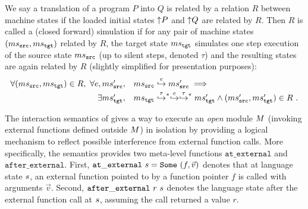 
We say a translation of a program $P$ into $Q$ is related by a
relation $R$ between machine states if the loaded initial states
${\uparrow}{P}$ and ${\uparrow}{Q}$ are related by $R$.
Then $R$ is called a (closed forward) simulation if for any
pair of machine states $(ms{}_{\texttt{src}{}},ms{}_{\texttt{tgt}{}})$ related by $R$, the target state $ms{}_{\texttt{tgt}{}}$ simulates one step
execution of the source state $ms{}_{\texttt{src}{}}$ (up to silent steps, denoted $\tau$) and the resulting
states are again related by $R$ (slightly simplified for presentation purposes):
\[
\begin{array}{r@{\ \ }l}
  \forall (\mssrc, \mstgt) \in R,~ \forall e, \mssrc',~&
  \mssrc \estep{e} \mssrc' \implies {}\\[1mm]
  \exists \mstgt',~&
  \mstgt \estep{\tau}^{\raisebox{-1mm}{\scriptsize$\ast$}} \estep{e}\estep{\tau}^{\raisebox{-1mm}{\scriptsize$\ast$}} \mstgt' \land (\mssrc', \mstgt') \in R~.
\end{array}
\]


The interaction semantics of \ccc{} gives a way to execute an
\emph{open} module $M$ (\ie invoking external functions defined
outside $M$) in isolation by providing a logical mechanism to
reflect possible interference from external function calls. More
specifically, the semantics provides two meta-level functions
$\mathtt{at\_external}$ and $\mathtt{after\_external}$. First,
$\mathtt{at\_external}~s = \mathtt{Some}~(f,\vec{v})$ denotes that
at language state $s$, an external function pointed to by a
function pointer $f$ is called with arguments $\vec{v}$. Second,
$\mathtt{after\_external}~r~s$ denotes the language state after the
external function call at $s$, assuming the call returned a value
$r$.

